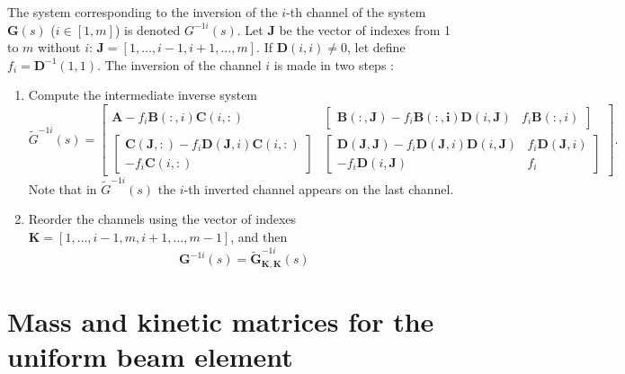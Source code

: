 The system corresponding to the inversion of the $i$-th channel of the system $\mathbf{G}(s)$ ($i\in\left[1,m\right]$) is denoted $G^{-1i}(s)$. Let $\mathbf{J}$ be the vector of indexes from 1 to $m$ without $i$:
$\mathbf{J} = \left[1,\dots,i-1,i+1,\dots,m\right]$. If $\mathbf{D}\left(i,i\right)\neq 0$, let define $f_i = \mathbf{D}^{-1}\left(1,1\right)$.
The inversion of the channel $i$ is made in two steps \cite{chebbi2016linear}:
\begin{enumerate}
	\item Compute the intermediate inverse system
		\begin{equation}
			\tilde{G}^{-1i}(s)=\left[\begin{array}{c|c} \mathbf{A} - f_i\mathbf{B}(:,i)\mathbf{C}(i,:) & \left[\begin{array}{cc}
			\mathbf{B}(:,\mathbf{J})-f_i\mathbf{B(:,i)}\mathbf{D}(i,\mathbf{J}) & f_i\mathbf{B}(:,i)
			\end{array}\right] \\ \hline
			\left[\begin{array}{c}
				\mathbf{C}(\mathbf{J},:)-f_i\mathbf{D}(\mathbf{J},i)\mathbf{C}(i,:)\\ -f_i\mathbf{C}(i,:)
			\end{array}\right] & \left[\begin{array}{cc}
			\mathbf{D}(\mathbf{J},\mathbf{J})-f_i\mathbf{D}(\mathbf{J},i)\mathbf{D}(i,\mathbf{J}) & f_i\mathbf{D}(\mathbf{J},i) \\
			-f_i\mathbf{D}(i,\mathbf{J}) & f_i
\end{array}\right]			 
			\end{array}\right].
		\end{equation}
		Note that in $\tilde{G}^{-1i}(s)$ the $i$-th inverted channel appears on the last channel.
	\item Reorder the channels using the vector of indexes $\mathbf{K}=\left[1,\dots,i-1,m,i+1,\dots,m-1\right]$, and then
	\begin{equation}
		\mathbf{G}^{-1i}(s) = \tilde{\mathbf{G}} ^{-1i}_{\mathbf{K},\mathbf{K}}(s)
	\end{equation}
\end{enumerate}

\section[Beam Element]{Mass and kinetic matrices for the uniform beam element}
\label{chap:appendix2}

